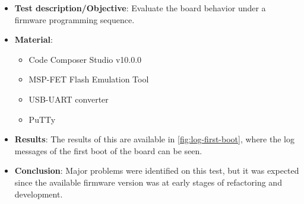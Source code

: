 \begin{itemize}
    \item \textbf{Test description/Objective}: Evaluate the board behavior under a firmware programming sequence.
    \item \textbf{Material}:
        \begin{itemize}
            \item Code Composer Studio v10.0.0
            \item MSP-FET Flash Emulation Tool
            \item USB-UART converter
            \item PuTTy
        \end{itemize}
    \item \textbf{Results}: The results of this are available in \autoref{fig:log-first-boot}, where the log messages of the first boot of the board can be seen.
    \item \textbf{Conclusion}: Major problems were identified on this test, but it was expected since the available firmware version was at early stages of refactoring and development.
\end{itemize}

